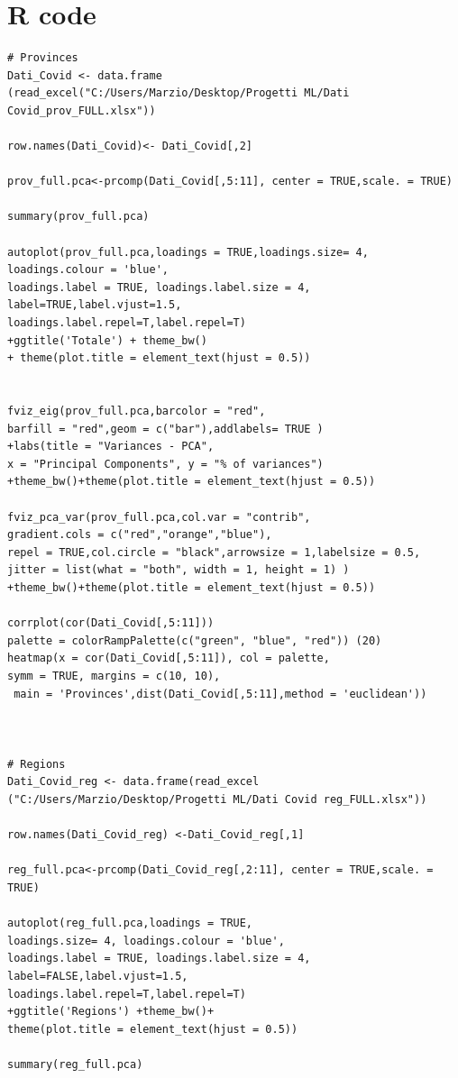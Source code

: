 \documentclass[
12pt, %
a4paper, %
oneside, %
headinclude,footinclude, %
BCOR5mm, %
]{scrartcl}
\begin{document}
\section{R code}
\begin{lstlisting}
# Provinces
Dati_Covid <- data.frame
(read_excel("C:/Users/Marzio/Desktop/Progetti ML/Dati Covid_prov_FULL.xlsx"))

row.names(Dati_Covid)<- Dati_Covid[,2]

prov_full.pca<-prcomp(Dati_Covid[,5:11], center = TRUE,scale. = TRUE)

summary(prov_full.pca)

autoplot(prov_full.pca,loadings = TRUE,loadings.size= 4,
loadings.colour = 'blue',
loadings.label = TRUE, loadings.label.size = 4,
label=TRUE,label.vjust=1.5,
loadings.label.repel=T,label.repel=T)
+ggtitle('Totale') + theme_bw()
+ theme(plot.title = element_text(hjust = 0.5))


fviz_eig(prov_full.pca,barcolor = "red",
barfill = "red",geom = c("bar"),addlabels= TRUE )
+labs(title = "Variances - PCA",
x = "Principal Components", y = "% of variances")
+theme_bw()+theme(plot.title = element_text(hjust = 0.5))

fviz_pca_var(prov_full.pca,col.var = "contrib",
gradient.cols = c("red","orange","blue"),
repel = TRUE,col.circle = "black",arrowsize = 1,labelsize = 0.5,
jitter = list(what = "both", width = 1, height = 1) ) 
+theme_bw()+theme(plot.title = element_text(hjust = 0.5)) 

corrplot(cor(Dati_Covid[,5:11]))
palette = colorRampPalette(c("green", "blue", "red")) (20)
heatmap(x = cor(Dati_Covid[,5:11]), col = palette, 
symm = TRUE, margins = c(10, 10),
 main = 'Provinces',dist(Dati_Covid[,5:11],method = 'euclidean'))



# Regions
Dati_Covid_reg <- data.frame(read_excel
("C:/Users/Marzio/Desktop/Progetti ML/Dati Covid reg_FULL.xlsx"))

row.names(Dati_Covid_reg) <-Dati_Covid_reg[,1]

reg_full.pca<-prcomp(Dati_Covid_reg[,2:11], center = TRUE,scale. = TRUE)

autoplot(reg_full.pca,loadings = TRUE,
loadings.size= 4, loadings.colour = 'blue',
loadings.label = TRUE, loadings.label.size = 4,
label=FALSE,label.vjust=1.5,
loadings.label.repel=T,label.repel=T)
+ggtitle('Regions') +theme_bw()+
theme(plot.title = element_text(hjust = 0.5))

summary(reg_full.pca)


\end{lstlisting}
\end{document}
